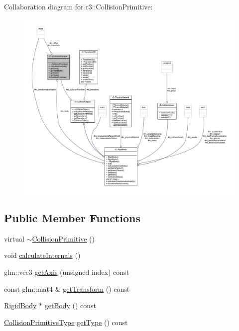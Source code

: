 Collaboration diagram for r3\+:\+:Collision\+Primitive\+:\nopagebreak
\begin{figure}[H]
\begin{center}
\leavevmode
\includegraphics[width=350pt]{classr3_1_1_collision_primitive__coll__graph}
\end{center}
\end{figure}
\subsection*{Public Member Functions}
\begin{DoxyCompactItemize}
\item 
virtual \mbox{\hyperlink{classr3_1_1_collision_primitive_adfa75f14067cb33a3f0049895a3db880}{$\sim$\+Collision\+Primitive}} ()
\item 
void \mbox{\hyperlink{classr3_1_1_collision_primitive_ae27cb70a6812491c2d8de97f22c07ac6}{calculate\+Internals}} ()
\item 
glm\+::vec3 \mbox{\hyperlink{classr3_1_1_collision_primitive_a78c959f5ca0a09a0fc2038ac7f30e45a}{get\+Axis}} (unsigned index) const
\item 
const glm\+::mat4 \& \mbox{\hyperlink{classr3_1_1_collision_primitive_acc4e2139c698bab280338db36d7cc586}{get\+Transform}} () const
\item 
\mbox{\hyperlink{classr3_1_1_rigid_body}{Rigid\+Body}} $\ast$ \mbox{\hyperlink{classr3_1_1_collision_primitive_af8dbda90cce34a6262309cbdb75feea7}{get\+Body}} () const
\item 
\mbox{\hyperlink{namespacer3_a7079ec5e42c1a55140d3bc093d49e319}{Collision\+Primitive\+Type}} \mbox{\hyperlink{classr3_1_1_collision_primitive_ac7a318fb788d1442e7d3390c8e465e14}{get\+Type}} () const
\end{DoxyCompactItemize}
